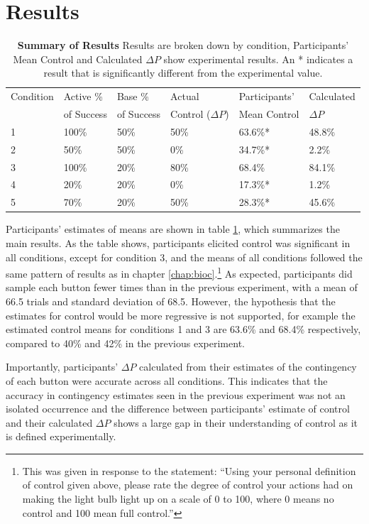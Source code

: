 \documentclass[USenglish,letterpaper,12pt,extrafontsizes,oneside,onecolumn,final]{memoir}
\newcommand{\deltap}{$\Delta P$}
\begin{document}
\section{Results}
\begin{table}[t] 	
	\begin{tabular}{llllll}
	\toprule
	Condition & Active \%  & Base \%    & Actual               & Participants' & Calculated \\
	          & of Success & of Success & Control ($\Delta P$) & Mean Control  & $\Delta P$ \\
	\midrule
	1 & 100\% & 50\% & 50\% & 63.6\%* & 48.8\% \\ 
	2 & 50\%  & 50\% & 0\%  & 34.7\%* & 2.2\%  \\
	3 & 100\% & 20\% & 80\% & 68.4\%  & 84.1\% \\
	4 & 20\%  & 20\% & 0\%  & 17.3\%* & 1.2\%  \\
	5 & 70\%  & 20\% & 50\% & 28.3\%* & 45.6\% \\	
	\bottomrule
	\end{tabular}
	\caption{\textbf{Summary of Results} Results are broken down by condition, Participants' Mean Control and Calculated \deltap \xspace show experimental results.  An * indicates a result that is significantly different from the experimental value. \label{tab:explore conditions}}
\end{table}

Participants' estimates of means are shown in table \ref{tab:explore conditions}, which summarizes the main results.  As the table shows, participants elicited control was significant in all conditions, except for condition 3, and the means of all conditions followed the same pattern of results as in chapter \ref{chap:bioc}.\footnote{This was given in response to the statement: ``Using your personal definition of control given above, please rate the degree of control your actions had on making the light bulb light up on a scale of 0 to 100, where 0 means no control and 100 mean full control.''} As expected, participants did sample each button fewer times than in the previous experiment, with a mean of 66.5 trials and standard deviation of 68.5. However, the hypothesis that the estimates for control would be more regressive is not supported, for example the estimated control means for conditions 1 and 3 are 63.6\% and 68.4\% respectively, compared to 40\% and 42\% in the previous experiment.  

Importantly, participants' \deltap \xspace calculated from their estimates of the contingency of each button were accurate across all conditions.  This indicates that the accuracy in contingency estimates seen in the previous experiment was not an isolated occurrence and the difference between participants' estimate of control and their calculated \deltap \xspace shows a large gap in their understanding of control as it is defined experimentally.      
\end{document}
